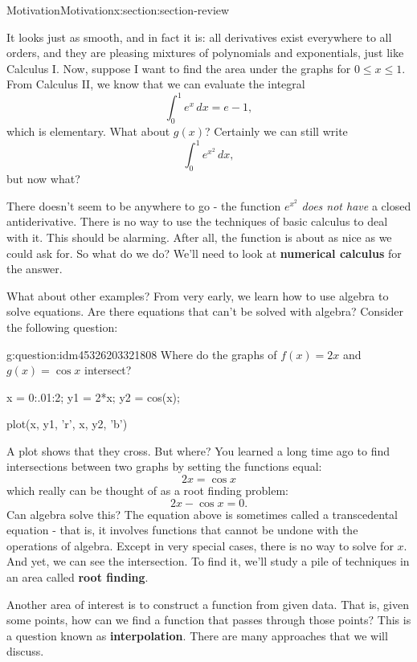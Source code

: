 \documentclass[oneside,10pt,]{article}
\newcommand{\terminology}[1]{\textbf{#1}}
\numberwithin{equation}{section}
\numberwithin{equation}{section}
\begin{document}
\begin{sectionptx}{Motivation}{}{Motivation}{}{}{x:section:section-review}
 It looks just as smooth, and in fact it is: all derivatives exist everywhere to all orders, and they are pleasing mixtures of polynomials and exponentials, just like Calculus I. Now, suppose I want to find the area under the graphs for \(0\leq x \leq 1\). From Calculus II, we know that we can evaluate the integral%
\begin{equation*}
\int_0^1 e^x \, dx = e - 1,
\end{equation*}
which is elementary. What about \(g(x)\)? Certainly we can still write%
\begin{equation*}
\int_0^1 e^{x^2} \, dx,
\end{equation*}
but now what?%
\par
There doesn't seem to be anywhere to go - the function \(e^{x^2}\) \emph{does not have} a closed antiderivative. There is no way to use the techniques of basic calculus to deal with it. This should be alarming. After all, the function is about as nice as we could ask for. So what do we do? We'll need to look at \terminology{numerical calculus} for the answer.%
\par
What about other examples? From very early, we learn how to use algebra to solve equations. Are there equations that can't be solved with algebra? Consider the following question: \begin{question}{}{g:question:idm45326203321808}%
Where do the graphs of \(f(x) = 2x\) and \(g(x) = \cos x\) intersect?\end{question}
%
\begin{sageinput}
x = 0:.01:2;
y1 = 2*x;
y2 = cos(x);

plot(x, y1, 'r', x, y2, 'b')
\end{sageinput}
A plot shows that they cross. But where? You learned a long time ago to find intersections between two graphs by setting the functions equal:%
\begin{equation*}
2x = \cos x
\end{equation*}
which really can be thought of as a root finding problem:%
\begin{equation*}
2x - \cos x = 0.
\end{equation*}
Can algebra solve this? The equation above is sometimes called a transcedental equation - that is, it involves functions that cannot be undone with the operations of algebra. Except in very special cases, there is no way to solve for \(x\). And yet, we can see the intersection. To find it, we'll study a pile of techniques in an area called \terminology{root finding}.%
\par
Another area of interest is to construct a function from given data. That is, given some points, how can we find a function that passes through those points? This is a question known as \terminology{interpolation}. There are many approaches that we will discuss.%
\end{sectionptx}
\end{document}
